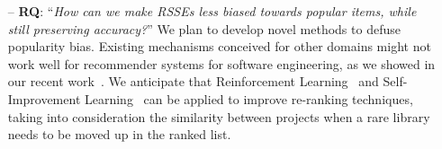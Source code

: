 \begin{itemize}

	\item[--] \textbf{RQ}: ``\emph{How can we make RSSEs less biased towards popular items, while still preserving accuracy?}'' We plan to develop novel methods to defuse popularity bias. Existing mechanisms conceived for other domains might not work well for recommender systems for software engineering, as we showed in our recent work~\cite{10174041}. We anticipate that Reinforcement Learning~\cite{DBLP:books/lib/SuttonB98} and Self-Improvement Learning~\cite{wang2020exposure} can be applied to improve re-ranking techniques, taking into consideration the similarity between projects when a rare library needs to be moved up in the ranked list. %
	
\end{itemize}



